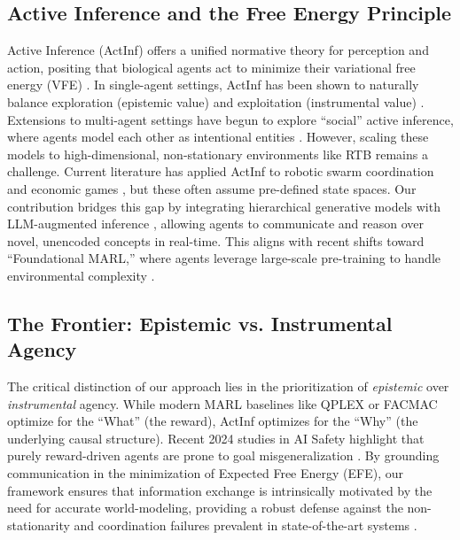 \subsection{Active Inference and the Free Energy Principle}
Active Inference (ActInf) offers a unified normative theory for perception and action, positing that biological agents act to minimize their variational free energy (VFE) \cite{friston2010free}. In single-agent settings, ActInf has been shown to naturally balance exploration (epistemic value) and exploitation (instrumental value) \cite{friston2017active, safron2024active}. Extensions to multi-agent settings have begun to explore ``social'' active inference, where agents model each other as intentional entities \cite{albarracin2023epistemic, smith2024active}. However, scaling these models to high-dimensional, non-stationary environments like RTB remains a challenge. Current literature has applied ActInf to robotic swarm coordination \cite{stulp2024active} and economic games \cite{friedman2024active}, but these often assume pre-defined state spaces. Our contribution bridges this gap by integrating hierarchical generative models with LLM-augmented inference \cite{wei2022chain}, allowing agents to communicate and reason over novel, unencoded concepts in real-time. This aligns with recent shifts toward ``Foundational MARL,'' where agents leverage large-scale pre-training to handle environmental complexity \cite{yang2024foundation}.

\subsection{The Frontier: Epistemic vs. Instrumental Agency}
The critical distinction of our approach lies in the prioritization of \textit{epistemic} over \textit{instrumental} agency. While modern MARL baselines like QPLEX \cite{wang2021qplex} or FACMAC \cite{peng2021facmac} optimize for the ``What'' (the reward), ActInf optimizes for the ``Why'' (the underlying causal structure). Recent 2024 studies in AI Safety highlight that purely reward-driven agents are prone to goal misgeneralization \cite{langosco2024goal}. By grounding communication in the minimization of Expected Free Energy (EFE), our framework ensures that information exchange is intrinsically motivated by the need for accurate world-modeling, providing a robust defense against the non-stationarity and coordination failures prevalent in state-of-the-art systems \cite{mousavi2024comprehensive, duan2024multiagent}.